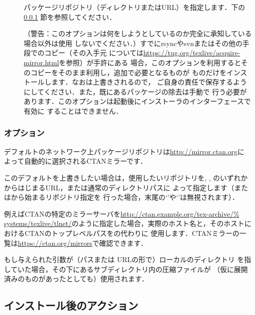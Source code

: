 \documentclass[uplatex,dvipdfmx,tombow]{jsarticle}
\begin{document}
\begin{description}
\item[]
パッケージリポジトリ（ディレクトリまたはURL）を指定します．下の\ref{sec:location}%
節を参照してください．

\item[]
（警告：このオプションは何をしようとしているのか完全に承知している場合以外は使用
しないでください．）すでにrsyncやsvnまたはその他の手段で\TL のコピー（その入手元
については\url{https://tug.org/texlive/acquire-mirror.html}を参照）が手許にある
場合，このオプションを利用するとそのコピーをそのまま利用し，追加で必要となるものが
ものだけをインストールします．なおは上書きされるので，
ご自身の責任で保存するようにしてください．また，既にあるパッケージの除去は手動で
行う必要があります．このオプションは起動後にインストーラのインターフェースで有効に
することはできません．
\end{description}

\subsubsection{オプション}
\label{sec:location}

デフォルトのネットワーク上パッケージリポジトリは\url{http://mirror.ctan.org}に
よって自動的に選択されるCTANミラーです．

このデフォルトを上書きしたい場合は，使用したいリポジトリを, , のいずれかからはじまるURL，または通常のディレクトリパスに
よって指定します（またはから始まるリポジトリ指定を
行った場合，末尾の`\code{/}'や`'は無視されます）．

例えばCTANの特定のミラーサーバを\url{http://ctan.example.org/tex-archive/%
systems/texlive/tlnet/}のように指定した場合，実際のホスト名と，そのホストに
おけるCTANのトップレベルパスをの代わりに
使用します．CTANミラーの一覧は\url{https://ctan.org/mirrors}で確認できます．

もし与えられた引数が（パスまたは URLの形で）ローカルのディレクトリ
を指していた場合，その下にあるサブディレクトリ内の圧縮ファイルが
（仮に展開済みのものがあったとしても）使用されます．

\subsection{インストール後のアクション}
\label{sec:postinstall}
\end{document}
